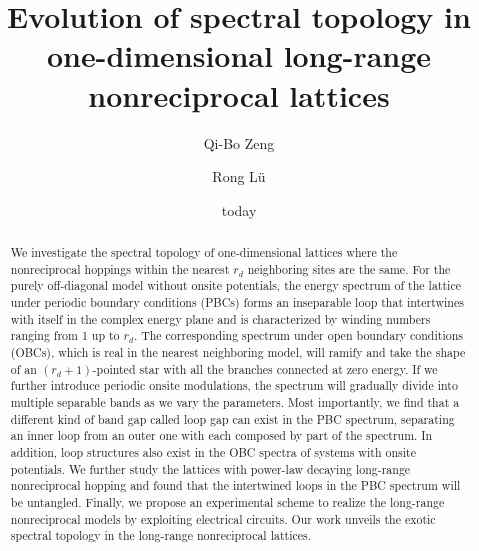 \documentclass[prb,aps,twocolumn,showpacs]{revtex4-2} %
\begin{document}
\title{Evolution of spectral topology in one-dimensional long-range nonreciprocal lattices}
\author{Qi-Bo Zeng}

\author{Rong L\"u}

\begin{abstract}
We investigate the spectral topology of one-dimensional lattices where the nonreciprocal hoppings within the nearest $r_d$ neighboring sites are the same. For the purely off-diagonal model without onsite potentials, the energy spectrum of the lattice under periodic boundary conditions (PBCs) forms an inseparable loop that intertwines with itself in the complex energy plane and is characterized by winding numbers ranging from 1 up to $r_d$. The corresponding spectrum under open boundary conditions (OBCs), which is real in the nearest neighboring model, will ramify and take the shape of an $(r_d+1)$-pointed star with all the branches connected at zero energy. If we further introduce periodic onsite modulations, the spectrum will gradually divide into multiple separable bands as we vary the parameters. Most importantly, we find that a different kind of band gap called loop gap can exist in the PBC spectrum, separating an inner loop from an outer one with each composed by part of the spectrum. In addition, loop structures also exist in the OBC spectra of systems with onsite potentials. We further study the lattices with power-law decaying long-range nonreciprocal hopping and found that the intertwined loops in the PBC spectrum will be untangled. Finally, we propose an experimental scheme to realize the long-range nonreciprocal models by exploiting electrical circuits. Our work unveils the exotic spectral topology in the long-range nonreciprocal lattices.
\end{abstract}
\maketitle
\date{today}
\end{document}
